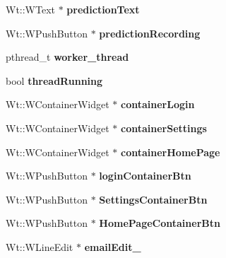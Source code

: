 \begin{DoxyCompactItemize}
\item 
\mbox{\label{class_home_page_a5e8e32e17b38b81890ed3d7e1bc54b9f}} 
Wt\+::\+W\+Text $\ast$ {\bfseries prediction\+Text}
\item 
\mbox{\label{class_home_page_ac6513658bfdf9e880f413042e1301019}} 
Wt\+::\+W\+Push\+Button $\ast$ {\bfseries prediction\+Recording}
\item 
\mbox{\label{class_home_page_ad2dd5ad7baa20ba3af98ea202d08cdbd}} 
pthread\+\_\+t {\bfseries worker\+\_\+thread}
\item 
\mbox{\label{class_home_page_a8840400b02f213102b90da8dd216532d}} 
bool {\bfseries thread\+Running}
\item 
\mbox{\label{class_home_page_a80e936d1c0377a7422784b8c2ff3ecac}} 
Wt\+::\+W\+Container\+Widget $\ast$ {\bfseries container\+Login}
\item 
\mbox{\label{class_home_page_a3b17c835146a6fdc739e0d288bbc3e49}} 
Wt\+::\+W\+Container\+Widget $\ast$ {\bfseries container\+Settings}
\item 
\mbox{\label{class_home_page_a4f7587b679365a61fba6deddc7fab620}} 
Wt\+::\+W\+Container\+Widget $\ast$ {\bfseries container\+Home\+Page}
\item 
\mbox{\label{class_home_page_a440cbe8e6ee11c653b8fb5e6c5fed0d4}} 
Wt\+::\+W\+Push\+Button $\ast$ {\bfseries login\+Container\+Btn}
\item 
\mbox{\label{class_home_page_a134dd4e29d4eb5b98a3b2c74d02bbc3c}} 
Wt\+::\+W\+Push\+Button $\ast$ {\bfseries Settings\+Container\+Btn}
\item 
\mbox{\label{class_home_page_a733ecbecb3ad83deec5cd6f4257ce0a0}} 
Wt\+::\+W\+Push\+Button $\ast$ {\bfseries Home\+Page\+Container\+Btn}
\item 
\mbox{\label{class_home_page_a4539d511820e19ecde37af6da7fc1961}} 
Wt\+::\+W\+Line\+Edit $\ast$ {\bfseries email\+Edit\+\_\+}
\item 

\end{DoxyCompactItemize}
